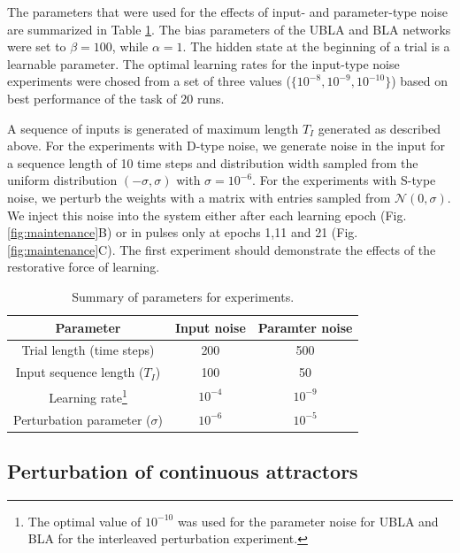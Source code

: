 \documentclass{article}
\newcounter{ct}
\theoremstyle{definition}
\theoremstyle{remark}
\begin{document}
The parameters that were used for the effects of input- and parameter-type noise are summarized in Table \ref{tab:params}.
The bias parameters of the UBLA and BLA networks were set to $\beta=100$, while $\alpha=1$. 
The hidden state at the beginning of a trial is a learnable parameter. 
The optimal learning rates for the input-type noise experiments were chosed from a set of three values ($\{10^{-8},10^{-9},10^{-10}\}$) based on best performance of the task of 20 runs.

A sequence of inputs is generated of maximum length $T_I$ generated as described above. 
For the experiments with D-type noise, we generate noise in the input for a sequence length of 10 time steps and distribution width sampled from the uniform distribution $(-\sigma,\sigma)$ with $\sigma=10^{-6}$.
For the experiments with S-type noise, we perturb the weights with a matrix with entries sampled from $\mathcal{N}(0, \sigma)$.
We inject this noise into the system either after each learning epoch (Fig. \ref{fig:maintenance}B) or in pulses only at epochs 1,11 and 21 (Fig. \ref{fig:maintenance}C).
The first experiment should demonstrate the effects of the restorative force of learning.

\begin{table}
\caption{Summary of parameters for experiments.}\label{tab:params}
\centering
\bgroup
\def\arraystretch{1.52}
\begin{tabular}{|c||c|c|}
\hline
Parameter     &  Input noise & Paramter noise \\\hline \hline
Trial length (time steps)	 &    200   & 500			\\\hline 
Input sequence length ($T_I$) &		100 & 50   \\\hline
Learning rate\footnote{The optimal value of $10^{-10}$ was used for the parameter noise for UBLA and BLA for the interleaved perturbation experiment. } &	 		$10^{-4}$   &  $10^{-9}$\\\hline 
Perturbation	parameter ($\sigma$) &		$10^{-6}$   & $10^{-5}$\\\hline 
\end{tabular}
\egroup
\end{table}







\subsection{Perturbation of continuous attractors}
\end{document}

